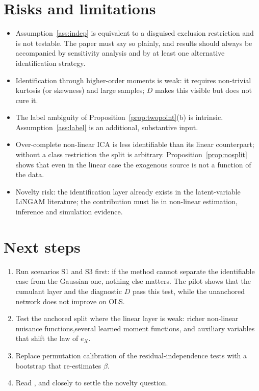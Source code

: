 \documentclass[11pt]{article}
\theoremstyle{definition}
\theoremstyle{remark}
\begin{document}








\section{Risks and limitations}\label{sec:risks}

\begin{itemize}
  \item Assumption~\ref{ass:indep} is equivalent to a disguised exclusion restriction and is not
  testable. The paper must say so plainly, and results should always be accompanied by sensitivity
  analysis and by at least one alternative identification strategy.
  \item Identification through higher-order moments is weak: it requires non-trivial kurtosis (or
  skewness) and large samples; $D$ makes this visible but does not cure it.
  \item The label ambiguity of Proposition~\ref{prop:twopoint}(b) is intrinsic. Assumption~\ref{ass:label}
  is an additional, substantive input.
  \item Over-complete non-linear ICA is less identifiable than its linear counterpart; without a
  class restriction the split is arbitrary. Proposition~\ref{prop:nosplit} shows that even in the
  linear case the exogenous source is not a function of the data.
  \item Novelty risk: the identification layer already exists in the latent-variable LiNGAM
  literature; the contribution must lie in non-linear estimation, inference and simulation evidence.
\end{itemize}

\section{Next steps}

\begin{enumerate}
  \item Run scenarios S1 and S3 first: if the method cannot separate the identifiable case from the
  Gaussian one, nothing else matters. The pilot shows that the cumulant layer and the diagnostic $D$
  pass this test, while the unanchored network does not improve on OLS.
  \item Test the anchored split where the linear layer is weak: richer non-linear nuisance functions,\n  several learned moment functions, and auxiliary variables that shift the law of $e_X$.
  \item Replace permutation calibration of the residual-independence tests with a bootstrap that
  re-estimates $\beta$.
  \item Read \citet{hoyer2008}, \citet{silva2017} and \citet{tramontano2025} closely to settle the
  novelty question.
\end{enumerate}
\end{document}
